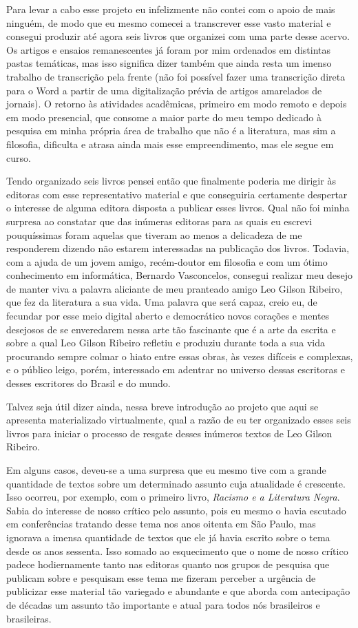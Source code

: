 \documentclass[
  a4paper,
  oneside]{scrbook}
\begin{document}
Para levar a cabo esse projeto eu infelizmente não contei com o apoio de
mais ninguém, de modo que eu mesmo comecei a transcrever esse vasto
material e consegui produzir até agora seis livros que organizei com uma
parte desse acervo. Os artigos e ensaios remanescentes já foram por mim
ordenados em distintas pastas temáticas, mas isso significa dizer também
que ainda resta um imenso trabalho de transcrição pela frente (não foi
possível fazer uma transcrição direta para o Word a partir de uma
digitalização prévia de artigos amarelados de jornais). O retorno às
atividades acadêmicas, primeiro em modo remoto e depois em modo
presencial, que consome a maior parte do meu tempo dedicado à pesquisa
em minha própria área de trabalho que não é a literatura, mas sim a
filosofia, dificulta e atrasa ainda mais esse empreendimento, mas ele
segue em curso.

Tendo organizado seis livros pensei então que finalmente poderia me
dirigir às editoras com esse representativo material e que conseguiria
certamente despertar o interesse de alguma editora disposta a publicar
esses livros. Qual não foi minha surpresa ao constatar que das inúmeras
editoras para as quais eu escrevi pouquíssimas foram aquelas que tiveram
ao menos a delicadeza de me responderem dizendo não estarem interessadas
na publicação dos livros. Todavia, com a ajuda de um jovem amigo,
recém-doutor em filosofia e com um ótimo conhecimento em informática,
Bernardo Vasconcelos, consegui realizar meu desejo de manter viva a
palavra aliciante de meu pranteado amigo Leo Gilson Ribeiro, que fez da
literatura a sua vida. Uma palavra que será capaz, creio eu, de fecundar
por esse meio digital aberto e democrático novos corações e mentes
desejosos de se enveredarem nessa arte tão fascinante que é a arte da
escrita e sobre a qual Leo Gilson Ribeiro refletiu e produziu durante
toda a sua vida procurando sempre colmar o hiato entre essas obras, às
vezes difíceis e complexas, e o público leigo, porém, interessado em
adentrar no universo dessas escritoras e desses escritores do Brasil e
do mundo.

Talvez seja útil dizer ainda, nessa breve introdução ao projeto que aqui
se apresenta materializado virtualmente, qual a razão de eu ter
organizado esses seis livros para iniciar o processo de resgate desses
inúmeros textos de Leo Gilson Ribeiro.

Em alguns casos, deveu-se a uma surpresa que eu mesmo tive com a grande
quantidade de textos sobre um determinado assunto cuja atualidade é
crescente. Isso ocorreu, por exemplo, com o primeiro livro,
\emph{Racismo e a Literatura Negra}. Sabia do interesse de nosso crítico
pelo assunto, pois eu mesmo o havia escutado em conferências tratando
desse tema nos anos oitenta em São Paulo, mas ignorava a imensa
quantidade de textos que ele já havia escrito sobre o tema desde os anos
sessenta. Isso somado ao esquecimento que o nome de nosso crítico padece
hodiernamente tanto nas editoras quanto nos grupos de pesquisa que
publicam sobre e pesquisam esse tema me fizeram perceber a urgência de
publicizar esse material tão variegado e abundante e que aborda com
antecipação de décadas um assunto tão importante e atual para todos nós
brasileiros e brasileiras.
\end{document}
